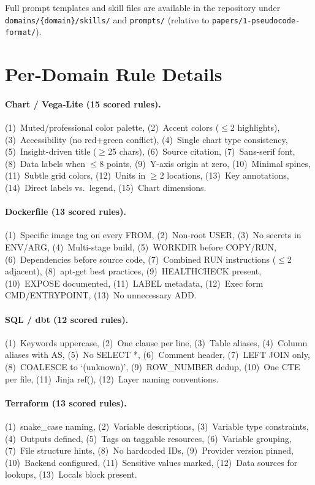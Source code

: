 \documentclass[sigconf,nonacm]{acmart}
\begin{document}
Full prompt templates and skill files are available in the repository
under \texttt{domains/\{domain\}/skills/} and \texttt{prompts/}
(relative to \texttt{papers/1-pseudocode-format/}).


\section{Per-Domain Rule Details}\label{app:rules}

\paragraph{Chart / Vega-Lite (15 scored rules).}
(1)~Muted/professional color palette, (2)~Accent colors ($\leq$2 highlights),
(3)~Accessibility (no red+green conflict), (4)~Single chart type consistency,
(5)~Insight-driven title ($\geq$25 chars), (6)~Source citation, (7)~Sans-serif
font, (8)~Data labels when $\leq$8 points, (9)~Y-axis origin at zero,
(10)~Minimal spines, (11)~Subtle grid colors, (12)~Units in $\geq$2 locations,
(13)~Key annotations, (14)~Direct labels vs.\ legend, (15)~Chart dimensions.

\paragraph{Dockerfile (13 scored rules).}
(1)~Specific image tag on every FROM, (2)~Non-root USER, (3)~No secrets in
ENV/ARG, (4)~Multi-stage build, (5)~WORKDIR before COPY/RUN, (6)~Dependencies
before source code, (7)~Combined RUN instructions ($\leq$2 adjacent),
(8)~apt-get best practices, (9)~HEALTHCHECK present, (10)~EXPOSE documented,
(11)~LABEL metadata, (12)~Exec form CMD/ENTRYPOINT, (13)~No unnecessary ADD.

\paragraph{SQL / dbt (12 scored rules).}
(1)~Keywords uppercase, (2)~One clause per line, (3)~Table aliases,
(4)~Column aliases with AS, (5)~No SELECT *, (6)~Comment header,
(7)~LEFT JOIN only, (8)~COALESCE to `(unknown)', (9)~ROW\_NUMBER dedup,
(10)~One CTE per file, (11)~Jinja ref(), (12)~Layer naming conventions.

\paragraph{Terraform (13 scored rules).}
(1)~snake\_case naming, (2)~Variable descriptions, (3)~Variable type
constraints, (4)~Outputs defined, (5)~Tags on taggable resources,
(6)~Variable grouping, (7)~File structure hints, (8)~No hardcoded IDs,
(9)~Provider version pinned, (10)~Backend configured, (11)~Sensitive values
marked, (12)~Data sources for lookups, (13)~Locals block present.
\end{document}
